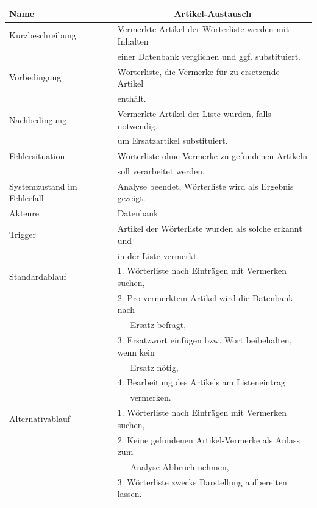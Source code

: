 \documentclass[paper=a4, parskip=half]{scrreprt}
\begin{document}
\begin{table}[hbt!]
\begin{tabular}{|l|l|}
\hline
Name                        & \multicolumn{1}{c|}{\textbf{Artikel-Austausch}} \\ \hline
Kurzbeschreibung            & Vermerkte Artikel der Wörterliste werden mit Inhalten \\
                            & einer Datenbank verglichen und ggf. substituiert. \\ \hline
Vorbedingung                & Wörterliste, die Vermerke für zu ersetzende Artikel \\
                            & enthält. \\ \hline
Nachbedingung               & Vermerkte Artikel der Liste wurden, falls notwendig, \\
                            & um Ersatzartikel substituiert. \\ \hline
Fehlersituation             & Wörterliste ohne Vermerke zu gefundenen Artikeln \\
                            & soll verarbeitet werden. \\ \hline
Systemzustand im Fehlerfall & Analyse beendet, Wörterliste wird als Ergebnis gezeigt. \\ \hline
Akteure                     & Datenbank \\ \hline
Trigger                     & Artikel der Wörterliste wurden als solche erkannt und \\
                            & in der Liste vermerkt. \\ \hline
Standardablauf              & 1. Wörterliste nach Einträgen mit Vermerken suchen, \\
                            & 2. Pro vermerktem Artikel wird die Datenbank nach \\ 
                            &    Ersatz befragt, \\
                            & 3. Ersatzwort einfügen bzw. Wort beibehalten, wenn kein \\
                            &    Ersatz nötig, \\
                            & 4. Bearbeitung des Artikels am Listeneintrag \\
                            &    vermerken. \\ \hline
Alternativablauf            & 1. Wörterliste nach Einträgen mit Vermerken suchen, \\
                            & 2. Keine gefundenen Artikel-Vermerke als Anlass zum \\
                            &    Analyse-Abbruch nehmen, \\
                            & 3. Wörterliste zwecks Darstellung aufbereiten lassen. \\ \hline 
\end{tabular}
\end{table}


\printglossary
\pagebreak

\nocite{*}
%
%


%
\end{document}
